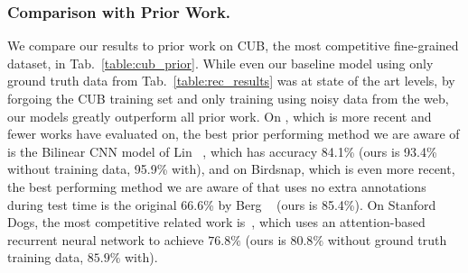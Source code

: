 \documentclass[runningheads]{llncs}
\begin{document}
\begin{SCtable}[][t]
{
}
{\caption{Comparison with prior work on CUB-200-2011~\cite{wahcub2002011}.
We only include methods which use no annotations at test time.
Here ``GT'' refers to using Ground Truth category labels in the training set of CUB, ``BBox'' indicates using bounding boxes, and ``Parts'' additionally uses part annotations.
}}
\label{table:cub_prior}
\end{SCtable}

\subsubsection{Comparison with Prior Work.}
We compare our results to prior work on CUB, the most competitive fine-grained dataset, in Tab.~\ref{table:cub_prior}.
While even our baseline model using only ground truth data from Tab.~\ref{table:rec_results} was at state of the art levels, by forgoing the CUB training set and only training using noisy data from the web, our models greatly outperform all prior work.
On \fgvc{}, which is more recent and fewer works have evaluated on, the best prior performing method we are aware of is the Bilinear CNN model of Lin \etal~\cite{lin2015bilinear}, which has accuracy 84.1\% (ours is 93.4\% without \fgvc{} training data, 95.9\% with), and on Birdsnap, which is even more recent, the best performing method we are aware of that uses no extra annotations during test time is the original 66.6\% by Berg \etal~\cite{bergbirdsnapcvpr2014} (ours is 85.4\%).
On Stanford Dogs, the most competitive related work is~\cite{sermanet2014attention}, which uses an attention-based recurrent neural network to achieve $76.8\%$ (ours is $80.8\%$ without ground truth training data, $85.9\%$ with).
\end{document}
